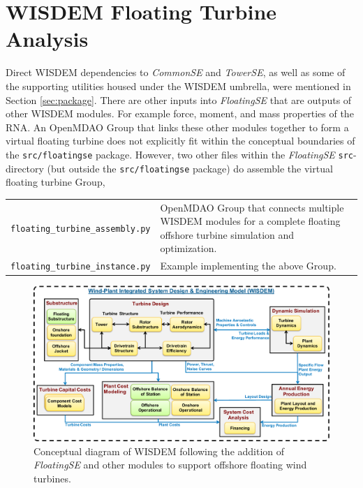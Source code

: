 
\chapter{WISDEM Floating Turbine Analysis}
\label{sec:other}
Direct WISDEM dependencies to \textit{CommonSE} and \textit{TowerSE}, as well as some of the
supporting utilities housed under the WISDEM umbrella, were mentioned in
Section \ref{sec:package}.  There are other inputs into \textit{FloatingSE} that
are outputs of other WISDEM modules.  For example force, moment, and
mass properties of the RNA.  An OpenMDAO Group that links these other
modules together to form a virtual floating turbine does not explicitly
fit within the conceptual boundaries of the \texttt{src/floatingse} package.
However, two other files within the \textit{FloatingSE} \texttt{src}-directory
(but outside the \texttt{src/floatingse} package) do assemble the virtual
floating turbine Group,

{\small
\begin{tabularx}{\linewidth}{ l X }
\texttt{floating\_turbine\_assembly.py} & OpenMDAO Group that connects  multiple WISDEM modules for a complete floating offshore turbine simulation and optimization.\\
\texttt{floating\_turbine\_instance.py} & Example implementing the above Group.
\end{tabularx}
}

\begin{figure}
  \begin{center}
    \includegraphics[width=6in]{figs/new_wisdem.pdf}
    \caption{Conceptual diagram of WISDEM following the addition of
      \textit{FloatingSE} and other modules to support offshore floating
      wind turbines.}
    \label{fig:new_wisdem}
  \end{center}
\end{figure}

